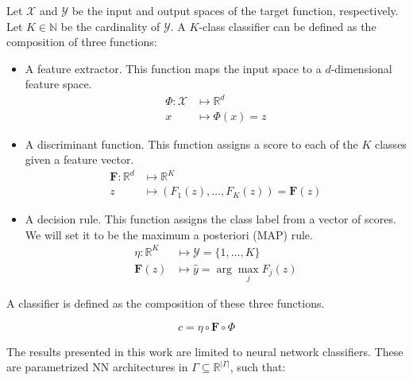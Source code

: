 \begin{definition}[Classifier]\label{def:classifier}
    Let $\mathcal{X}$ and $\mathcal{Y}$ be the input and output spaces of the target function, respectively.
    Let $K \in \mathbb{N}$ be the cardinality of $\mathcal{Y}$.
    A $K$-class classifier can be defined as the 
    composition of three functions:

    \begin{itemize}
        \item A feature extractor. This function maps the input space to a $d$-dimensional feature space.
            $$ 
            \begin{aligned}
                \Phi: \mathcal{X} & \longmapsto \mathbb{R}^d \\
                x & \longmapsto \Phi(x) = z
            \end{aligned}
            $$

        \item A discriminant function. This function assigns a score
        to each of the $K$ classes given a feature vector. 
            $$
            \begin{aligned}
                \bm{F}: \mathbb{R}^d  & \longmapsto \mathbb{R}^K \\
                z & \longmapsto \left ( F_1(z), \dots, F_K(z) \right ) = \bm{F}(z)
            \end{aligned}
            $$
        \item A decision rule. This function assigns the class label from a vector of scores.
        We will set it to be the maximum a posteriori (MAP) rule.
            $$
                \begin{aligned}
                    \eta: \mathbb{R}^K & \longmapsto \mathcal{Y} = \{1, \dots, K \} \\
                    \bm{F}(z) & \longmapsto \hat{y} = \arg \max_{j} F_j(z)
                \end{aligned}
            $$
    \end{itemize}

    A classifier is defined as the composition of these three functions.

    $$
    c = \eta \circ \bm{F} \circ \Phi
    $$
\end{definition}

The results presented in this work are limited to neural network classifiers. These are
parametrized NN architectures in $\Gamma \subseteq \mathbb{R}^{|\Gamma|}$, such that:

